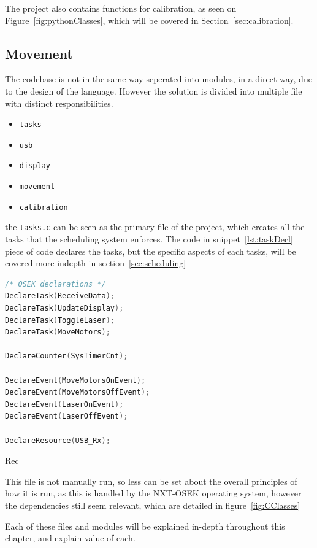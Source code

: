 The project also contains functions for calibration, as seen on Figure~\ref{fig:pythonClasses}, which will be covered in Section~\ref{sec:calibration}.


\subsection{Movement}
The codebase is not in the same way seperated into modules, in a direct way, due to the design of the language.
 However the solution is divided into multiple file with distinct responsibilities.

\begin{itemize}
	\item \texttt{tasks}
	\item \texttt{usb}
	\item \texttt{display}
	\item \texttt{movement}
	\item \texttt{calibration}
\end{itemize}

the \texttt{tasks.c} can be seen as the primary file of the project, which creates all the tasks that the scheduling system enforces.
The code in snippet~\ref{lst:taskDecl} piece of code declares the tasks, but the specific aspects of each tasks, will be covered more indepth in section~\ref{sec:scheduling}
\begin{lstlisting}[language={c},label={lst:taskDecl},caption={Declaration of tasks, counters and events}]
/* OSEK declarations */
DeclareTask(ReceiveData);
DeclareTask(UpdateDisplay);
DeclareTask(ToggleLaser);
DeclareTask(MoveMotors);

DeclareCounter(SysTimerCnt);

DeclareEvent(MoveMotorsOnEvent);
DeclareEvent(MoveMotorsOffEvent);
DeclareEvent(LaserOnEvent);
DeclareEvent(LaserOffEvent);

DeclareResource(USB_Rx);
\end{lstlisting}
Rec


This file is not manually run, so less can be set about the overall principles of how it is run, as this is handled by the NXT-OSEK operating system, however the dependencies still seem relevant, which are detailed in figure~\ref{fig:CClasses}


Each of these files and modules will be explained in-depth throughout this chapter, and explain value of each.


